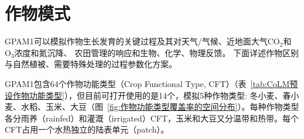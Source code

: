 \chapter{作物模式}

GPAM1可以模拟作物生长发育的关键过程及其对天气/气候、近地面大气$\mathrm{CO_2}$和$\mathrm{O_3}$浓度和氮沉降、
农田管理的响应和生物、化学、物理反馈。
下面详述作物区别与自然植被、需要特殊处理的过程参数化方案。

GPAM1包含64个作物功能类型（Crop Functional Type, CFT）（表~\ref{tab:CoLM预设作物功能类型}），但目前可打开使用的是14个，模拟5种作物类型: 冬小麦、春小麦、水稻、玉米、大豆（图~\ref{fig:作物功能类型覆盖率的空间分布}）。每种作物类型各分雨养（rainfed）和灌溉（irrigated）CFT，玉米和大豆又分温带和热带。每个CFT占用一个水热独立的陆表单元（patch）。
